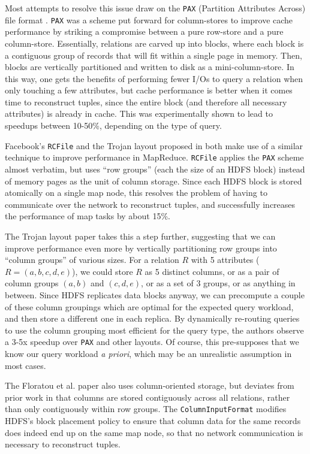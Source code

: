 \documentclass[twocolumn]{article}
\begin{document}
Most attempts to resolve this issue draw on the \verb+PAX+ (Partition Attributes
Across) file format \cite{ref:pax}.  \verb+PAX+ was a scheme put forward for
column-stores to improve cache performance
by striking a compromise between a pure row-store and a pure column-store.  Essentially, 
relations are carved up into blocks, where each block is a contiguous group of
records that will fit within a single page in memory.  Then, blocks are
vertically partitioned and written to disk as a mini-column-store.  In this way, one
gets the benefits of performing fewer I/Os to query a relation when only touching a
few attributes, but cache performance is better when it comes time to reconstruct
tuples, since the entire block (and therefore all necessary attributes) is already
in cache.  This was experimentally shown to lead to speedups between 10-50\%,
depending on the type of query.

Facebook's \verb+RCFile+ and the Trojan layout proposed in
\cite{ref:trojan-layout} both make use of a similar technique to improve performance
in MapReduce.  \verb+RCFile+ applies the \verb+PAX+ scheme almost verbatim,
but uses ``row groups'' (each the size of an HDFS block) instead of memory
pages as the unit of column storage.  Since each HDFS block is stored atomically
on a single map node, this resolves the problem of having to communicate over the
network to reconstruct tuples, and successfully increases the performance of
map tasks by about 15\%.

The Trojan layout paper takes this a step further, suggesting
that we can improve performance even more by vertically partitioning row groups into
``column groups'' of various sizes.  For a relation $R$ with 5 attributes
($R = (a, b, c, d, e)$), we could store $R$ as 5 distinct columns, or as a pair
of column groups $(a, b)$ and $(c, d, e)$, or as a set of 3 groups, or as anything
in between.  Since HDFS replicates data blocks anyway, we can precompute a couple
of these column groupings which are optimal for the expected query workload, 
and then store a different one in each replica.  By dynamically
re-routing queries to use the column grouping most efficient for the query type,
the authors observe a 3-5x speedup over \verb+PAX+ and other layouts.
Of course, this pre-supposes that we know our query workload \emph{a priori}, which
may be an unrealistic assumption in most cases.

The Floratou et al. paper also uses column-oriented storage,
but deviates from prior work in that columns are stored contiguously across all
relations, rather than only contiguously within row groups.  The \verb+ColumnInputFormat+
modifies HDFS's block placement policy to ensure that column data for the same
records does indeed end up on the same map node, so that no network communication
is necessary to reconstruct tuples.
\end{document}
